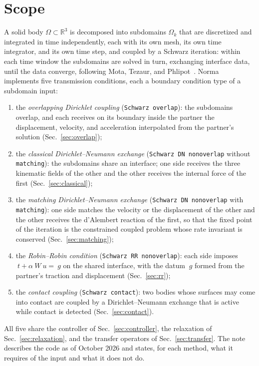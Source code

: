 \documentclass[11pt]{article}
\newcommand{\code}[1]{\texttt{#1}}
\begin{document}
\tableofcontents

\section{Scope}
\label{sec:scope}

A solid body $\Omega \subset \mathbb{R}^3$ is decomposed into subdomains
$\Omega_k$ that are discretized and integrated in time independently, each
with its own mesh, its own time integrator, and its own time step, and
coupled by a Schwarz iteration: within each time window the subdomains are
solved in turn, exchanging interface data, until the data converge,
following Mota, Tezaur, and Phlipot~\cite{MotaTezaurPhlipot2022}. Norma
implements five transmission conditions, each a boundary condition type of
a subdomain input:
\begin{enumerate}[itemsep=2pt]
\item the \emph{overlapping Dirichlet coupling} (\code{Schwarz overlap}):
  the subdomains overlap, and each receives on its boundary inside the
  partner the displacement, velocity, and acceleration interpolated from
  the partner's solution (Sec.~\ref{sec:overlap});
\item the \emph{classical Dirichlet--Neumann exchange}
  (\code{Schwarz DN nonoverlap} without \code{matching}): the subdomains
  share an interface; one side receives the three kinematic fields of the
  other and the other receives the internal force of the first
  (Sec.~\ref{sec:classical});
\item the \emph{matching Dirichlet--Neumann exchange}
  (\code{Schwarz DN nonoverlap} with \code{matching}): one side matches the
  velocity or the displacement of the other and the other receives the
  d'Alembert reaction of the first, so that the fixed point of the
  iteration is the constrained coupled problem whose rate invariant is
  conserved (Sec.~\ref{sec:matching});
\item the \emph{Robin--Robin condition} (\code{Schwarz RR nonoverlap}):
  each side imposes $~t + \alpha ~W ~u = ~g$ on the shared interface, with
  the datum $~g$ formed from the partner's traction and displacement
  (Sec.~\ref{sec:rr});
\item the \emph{contact coupling} (\code{Schwarz contact}): two bodies
  whose surfaces may come into contact are coupled by a Dirichlet--Neumann
  exchange that is active while contact is detected
  (Sec.~\ref{sec:contact}).
\end{enumerate}
All five share the controller of Sec.~\ref{sec:controller}, the
relaxation of Sec.~\ref{sec:relaxation}, and the transfer operators of
Sec.~\ref{sec:transfer}. The note describes the code as of October 2026
and states, for each method, what it requires of the input and what it
does not do.
\end{document}
